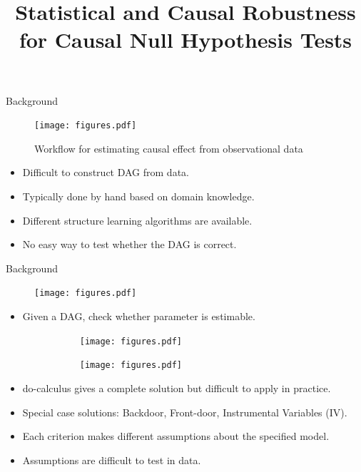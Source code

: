 \documentclass{beamer}
\begin{document}
\title[]{Statistical and Causal Robustness for Causal Null Hypothesis Tests}
\date{}

\maketitle

\begin{frame}{Background}
	\begin{figure}
		\center
		\texttt{[image: figures.pdf]}
		\caption*{Workflow for estimating causal effect from observational data}
	\end{figure}

	\vspace{1em}
	\begin{itemize}
		\item Difficult to construct DAG from data.
		\item Typically done by hand based on domain knowledge.
		\item Different structure learning algorithms are available.
		\item No easy way to test whether the DAG is correct.
	\end{itemize}	
\end{frame}

\begin{frame}{Background}
	\begin{figure}
		\center
		\texttt{[image: figures.pdf]}
	\end{figure}
	\vspace{1em}
	\begin{itemize}
		\item Given a DAG, check whether parameter is estimable.
			\begin{figure}
				\center
				\begin{subfigure}{0.25 \textwidth}
					\center
					\texttt{[image: figures.pdf]}
				\end{subfigure}%
				\begin{subfigure}{0.25 \textwidth}
					\center
					\texttt{[image: figures.pdf]}
				\end{subfigure}
			\end{figure}
		\item do-calculus gives a complete solution but difficult to apply in practice.
		\item Special case solutions: Backdoor, Front-door, Instrumental Variables (IV).
		\item Each criterion makes different assumptions about the specified model.
		\item Assumptions are difficult to test in data.
	\end{itemize}
\end{frame}
\end{document}
